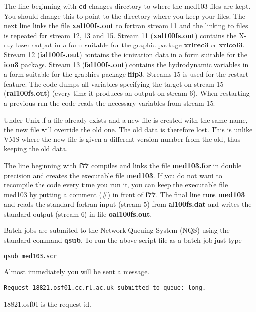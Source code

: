 The line beginning with {\bf cd} changes directory to where the med103 files are kept.
You should change
this to point to the directory where you keep your files. 
The next line links the file {\bf xal100fs.out} to fortran stream 11 and the linking to files 
is repeated for stream 12, 13 and 15.
Stream 11 ({\bf xal100fs.out}) contains the X-ray laser output in a
form suitable for the graphic package {\bf xrlrec3} or {\bf xrlcol3}.
Stream 12 ({\bf ial100fs.out})
contains the ionization data in a form suitable for the {\bf ion3} package.
Stream 13 ({\bf fal100fs.out}) contains the hydrodynamic
variables in a form suitable for the graphics package {\bf flip3}.
Streams 15 is used for the restart feature.
The code dumps all variables specifying the target on stream 15 ({\bf ral100fs.out}) (every time
it produces an output on stream 6).
When restarting a previous run the code reads the necessary variables from stream 15.

Under Unix if a file already exists and a new file is created with the same name, the new file
will override the old one. The old data is therefore lost. 
This is unlike VMS where the new file is given a different version number from the old, thus keeping the old data.

The line beginning with {\bf f77} compiles and links the file {\bf med103.for} in double precision
and creates the executable file {\bf med103}. 
If you do not want to recompile the code every time you run it,
you can keep the executable file med103 by putting a comment ({\#})
in front of {\bf f77}.
The final line runs {\bf med103} and reads the standard fortran input 
(stream 5) from {\bf al100fs.dat} and writes the standard output (stream 6) in file {\bf oal100fs.out}. 

Batch jobs are submited to the  Network Queuing System (NQS) using the standard 
command {\bf qsub}.
To run the above script file as a batch job just type
\begin{verbatim}
qsub med103.scr
\end{verbatim}
Almost immediately you will be sent a message.
\begin{verbatim}
Request 18821.osf01.cc.rl.ac.uk submitted to queue: long.
\end{verbatim}
18821.osf01 is the request-id. 

